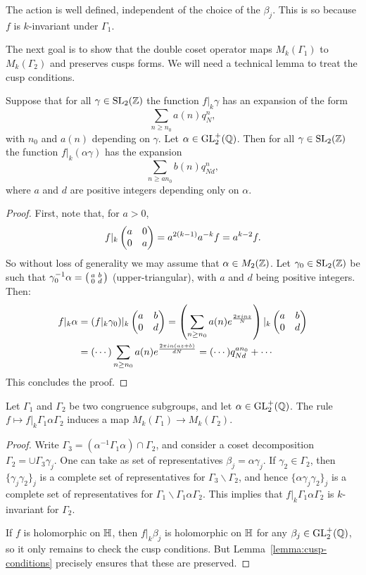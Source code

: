 \begin{remark}
  The action is well defined, independent of the choice of the $\beta_j$. This is so because $f$ is $k$-invariant under $\Gamma_1$.
\end{remark}
The next goal is to show that the double coset operator maps $M_k(\Gamma_1)$ to $M_k(\Gamma_2)$ and preserves cusps forms. We will need a technical lemma to treat the cusp conditions.
\begin{lemma}
\label{lemma:cusp-conditions}
Suppose that for all $\gamma\in\operatorname{SL}_2(\mathbb{Z})$ the function $f|_k\gamma$ has an expansion of the form
\[
\sum_{n\geq n_0} a(n)q_N^n,
\]
with $n_0$ and $a(n)$ depending on $\gamma$. Let $\alpha\in\operatorname{GL}_2^+(\mathbb{Q})$. Then for all $\gamma\in\operatorname{SL}_2(\mathbb{Z})$ the function $f|_k(\alpha\gamma)$ has the expansion
\[
\sum_{n\geq an_0} b(n)q_{Nd}^n,
\]
where $a$ and $d$ are positive integers depending only on $\alpha$.
\end{lemma}
\begin{proof}
  First, note that, for $a>0$,
\[
f|_k\left(\begin{matrix}a&0\\0&a\end{matrix}\right) = a^{2(k-1)}a^{-k}f = a^{k-2}f.
\]
So without loss of generality we may assume that $\alpha\in M_2(\mathbb{Z})$. Let $\gamma_0\in\operatorname{SL}_2(\mathbb{Z})$ be such that $\gamma_0^{-1}\alpha=\left(\begin{smallmatrix}a&b\\0&d\end{smallmatrix}\right)$ (upper-triangular), with $a$ and $d$ being positive integers. Then:
\begin{align*}
f|_k\alpha &= (f|_k\gamma_0)|_k\left(\begin{matrix}a&b\\0&d\end{matrix}\right) = \left(\sum_{n\geq n_0}a(n)e^{\frac{2\pi i n z}{N}}\right)|_k\left(\begin{matrix}a&b\\0&d\end{matrix}\right)\\
&=(\cdots)\sum_{n\geq n_0} a(n)e^{\frac{2\pi i n(az+b)}{dN}} = (\cdots) q_{Nd}^{an_0}+\cdots
\end{align*}
This concludes the proof.
\end{proof}

\begin{proposition}
\label{prop:double-coset-operators}
Let $\Gamma_1$ and $\Gamma_2$ be two congruence subgroups, and let $\alpha\in\operatorname{GL}_2^+(\mathbb{Q})$.
The rule $f\mapsto f|_k\Gamma_1\alpha\Gamma_2$ induces a map $M_k(\Gamma_1)\to M_k(\Gamma_2)$.
\end{proposition}
\begin{proof}
 Write $\Gamma_3=(\alpha^{-1}\Gamma_1\alpha)\cap \Gamma_2$, and consider a coset decomposition $\Gamma_2= \cup \Gamma_3\gamma_j$. One can take as set of representatives $\beta_j=\alpha\gamma_j$. If $\gamma_2\in\Gamma_2$, then $\{\gamma_j\gamma_2\}_j$ is a complete set of representatives for $\Gamma_3\backslash \Gamma_2$, and hence $\{\alpha\gamma_j\gamma_2\}_j$ is a complete set of representatives for $\Gamma_1\backslash\Gamma_1\alpha\Gamma_2$. This implies that $f|_k\Gamma_1\alpha\Gamma_2$ is $k$-invariant for $\Gamma_2$.

If $f$ is holomorphic on $\mathbb{H}$, then $f|_k\beta_j$ is holomorphic on $\mathbb{H}$ for any $\beta_j\in\operatorname{GL}_2^+(\mathbb{Q})$, so it only remains to check the cusp conditions. But Lemma~\ref{lemma:cusp-conditions} precisely ensures that these are preserved.
\end{proof}

